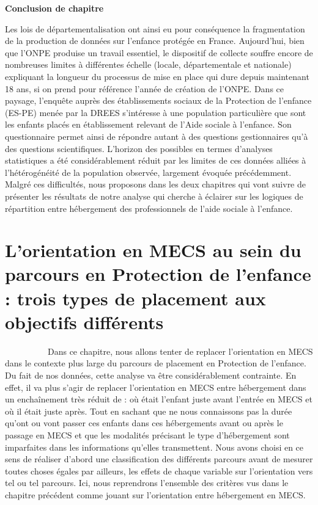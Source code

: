\documentclass[
  12,
  a4paper,
]{report}
\begin{document}
\textbf{Conclusion de chapitre}

Les lois de départementalisation ont ainsi eu pour conséquence la
fragmentation de la production de données sur l'enfance protégée en
France. Aujourd'hui, bien que l'ONPE produise un travail essentiel, le
dispositif de collecte souffre encore de nombreuses limites à
différentes échelle (locale, départementale et nationale) expliquant la
longueur du processus de mise en place qui dure depuis maintenant 18
ans, si on prend pour référence l'année de création de l'ONPE. Dans ce
paysage, l'enquête auprès des établissements sociaux de la Protection de
l'enfance (ES-PE) menée par la DREES s'intéresse à une population
particulière que sont les enfants placés en établissement relevant de
l'Aide sociale à l'enfance. Son questionnaire permet ainsi de répondre
autant à des questions gestionnaires qu'à des questions scientifiques.
L'horizon des possibles en termes d'analyses statistiques a été
considérablement réduit par les limites de ces données alliées à
l'hétérogénéité de la population observée, largement évoquée
précédemment. Malgré ces difficultés, nous proposons dans les deux
chapitres qui vont suivre de présenter les résultats de notre analyse
qui cherche à éclairer sur les logiques de répartition entre hébergement
des professionnels de l'aide sociale à l'enfance.

\newpage

\newpage

\hypertarget{lorientation-en-mecs-au-sein-du-parcours-en-protection-de-lenfance-trois-types-de-placement-aux-objectifs-diffuxe9rents}{%
\chapter{L'orientation en MECS au sein du parcours en Protection de
l'enfance : trois types de placement aux objectifs
différents}\label{lorientation-en-mecs-au-sein-du-parcours-en-protection-de-lenfance-trois-types-de-placement-aux-objectifs-diffuxe9rents}}

~~~~~~~~~~Dans ce chapitre, nous allons tenter de replacer l'orientation
en MECS dans le contexte plus large du parcours de placement en
Protection de l'enfance. Du fait de nos données, cette analyse va être
considérablement contrainte. En effet, il va plus s'agir de replacer
l'orientation en MECS entre hébergement dans un enchaînement très réduit
de : où était l'enfant juste avant l'entrée en MECS et où il était juste
après. Tout en sachant que ne nous connaissons pas la durée qu'ont ou
vont passer ces enfants dans ces hébergements avant ou après le passage
en MECS et que les modalités précisant le type d'hébergement sont
imparfaites dans les informations qu'elles transmettent. Nous avons
choisi en ce sens de réaliser d'abord une classification des différents
parcours avant de mesurer toutes choses égales par ailleurs, les effets
de chaque variable sur l'orientation vers tel ou tel parcours. Ici, nous
reprendrons l'ensemble des critères vus dans le chapitre précédent comme
jouant sur l'orientation entre hébergement en MECS.
\end{document}
